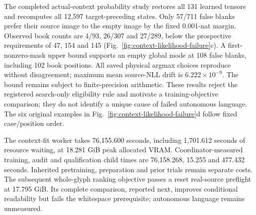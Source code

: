 The completed actual-context probability study restores all 131 learned tensors
and recomputes all 12,597 target-preceding states. Only 57/711 false blanks
prefer their source image to the empty image by the fixed 0.001-nat margin.
Observed book counts are 4/93, 26/307 and 27/289, below the prospective
requirements of 47, 154 and 145 (Fig.~\ref{fig:context-likelihood-failure}c).
A first-nonzero-mask upper bound supports an empty global mode at 108 false
blanks, including 102 book positions. All saved physical argmax choices
reproduce without disagreement; maximum mean source-NLL drift is
$6.222\times10^{-9}$. The bound remains subject to finite-precision arithmetic.
These results reject the registered search-only eligibility rule and motivate
a training-objective comparison; they do not identify a unique cause of failed
autonomous language. The six original examples in
Fig.~\ref{fig:context-likelihood-failure}d follow fixed case/position order.

The context-fit worker takes 76,155.600 seconds, including 1,701.612 seconds of
resource waiting, at 18.281 GiB peak allocated VRAM. Coordinator-measured
training, audit and qualification child times are 76,158.268, 15.255 and
477.432 seconds. Inherited pretraining, preparation and prior trials remain
separate costs. The subsequent whole-glyph ranking objective passes a reset
real-source preflight at 17.795 GiB. Its complete comparison, reported next,
improves conditional readability but fails the whitespace prerequisite;
autonomous language remains unmeasured.
